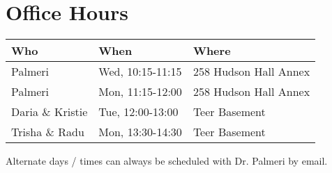 \section{Office Hours}
\begin{center}
    \begin{tabular}{|l|l|l|} \hline
        \textbf{Who} & \textbf{When} & \textbf{Where} \\ \hline
        Palmeri & Wed, 10:15-11:15 & 258 Hudson Hall Annex \\
        Palmeri & Mon, 11:15-12:00 & 258 Hudson Hall Annex \\
        Daria \& Kristie & Tue, 12:00-13:00 & Teer Basement \\
        Trisha \& Radu & Mon, 13:30-14:30 & Teer Basement \\ \hline
    \end{tabular}
\end{center}

Alternate days / times can always be scheduled with Dr. Palmeri by email.
